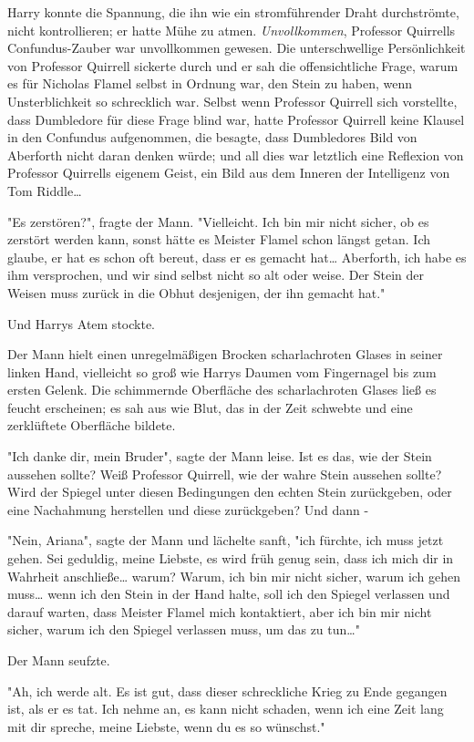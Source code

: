 {Harry konnte die Spannung, die ihn wie ein stromführender Draht durchströmte, nicht kontrollieren; er hatte Mühe zu atmen. \emph{Unvollkommen}, Professor Quirrells Confundus-Zauber war unvollkommen gewesen. Die unterschwellige Persönlichkeit von Professor Quirrell sickerte durch und er sah die offensichtliche Frage, warum es für Nicholas Flamel selbst in Ordnung war, den Stein zu haben, wenn Unsterblichkeit so schrecklich war. Selbst wenn Professor Quirrell sich vorstellte, dass Dumbledore für diese Frage blind war, hatte Professor Quirrell keine Klausel in den Confundus aufgenommen, die besagte, dass Dumbledores Bild von Aberforth nicht daran denken würde; und all dies war letztlich eine Reflexion von Professor Quirrells eigenem Geist, ein Bild aus dem Inneren der Intelligenz von Tom Riddle…

"Es zerstören?", fragte der Mann. "Vielleicht. Ich bin mir nicht sicher, ob es zerstört werden kann, sonst hätte es Meister Flamel schon längst getan. Ich glaube, er hat es schon oft bereut, dass er es gemacht hat… Aberforth, ich habe es ihm versprochen, und wir sind selbst nicht so alt oder weise. Der Stein der Weisen muss zurück in die Obhut desjenigen, der ihn gemacht hat."

Und Harrys Atem stockte.

Der Mann hielt einen unregelmäßigen Brocken scharlachroten Glases in seiner linken Hand, vielleicht so groß wie Harrys Daumen vom Fingernagel bis zum ersten Gelenk. Die schimmernde Oberfläche des scharlachroten Glases ließ es feucht erscheinen; es sah aus wie Blut, das in der Zeit schwebte und eine zerklüftete Oberfläche bildete.

"Ich danke dir, mein Bruder", sagte der Mann leise. Ist es das, wie der Stein aussehen sollte? Weiß Professor Quirrell, wie der wahre Stein aussehen sollte? Wird der Spiegel unter diesen Bedingungen den echten Stein zurückgeben, oder eine Nachahmung herstellen und diese zurückgeben? Und dann -

"Nein, Ariana", sagte der Mann und lächelte sanft, "ich fürchte, ich muss jetzt gehen. Sei geduldig, meine Liebste, es wird früh genug sein, dass ich mich dir in Wahrheit anschließe… warum? Warum, ich bin mir nicht sicher, warum ich gehen muss… wenn ich den Stein in der Hand halte, soll ich den Spiegel verlassen und darauf warten, dass Meister Flamel mich kontaktiert, aber ich bin mir nicht sicher, warum ich den Spiegel verlassen muss, um das zu tun…"

Der Mann seufzte.

"Ah, ich werde alt. Es ist gut, dass dieser schreckliche Krieg zu Ende gegangen ist, als er es tat. Ich nehme an, es kann nicht schaden, wenn ich eine Zeit lang mit dir spreche, meine Liebste, wenn du es so wünschst."

}
